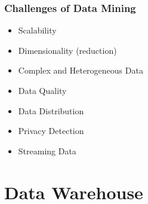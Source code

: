\documentclass[10pt,a4paper]{article}
\begin{document}
\begin{justify}
\subsubsection{Challenges of Data Mining}
\begin{itemize}
	\item Scalability
	\item Dimensionality (reduction)
	\item Complex and Heterogeneous Data
	\item Data Quality
	\item Data Distribution
	\item Privacy Detection
	\item Streaming Data
\end{itemize}

\section{Data Warehouse}

\end{justify}
\end{document}
